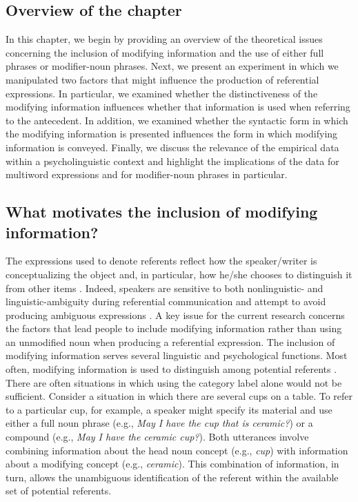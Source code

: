 \documentclass[output=paper]{langsci/langscibook}
\begin{document}
\subsection{Overview of the chapter}

In this chapter, we begin by providing an overview of the theoretical
issues concerning the inclusion of modifying information and the use
of either full phrases or modifier-noun phrases. Next, we present an
experiment in which we manipulated two factors that might influence
the production of referential expressions. In particular, we examined
whether the distinctiveness of the modifying information influences
whether that information is used when referring to the antecedent. In
addition, we examined whether the syntactic form in which the
modifying information is presented influences the form in which
modifying information is conveyed. Finally, we discuss the relevance
of the empirical data within a psycholinguistic context and highlight
the implications of the data for multiword expressions and for
modifier-noun phrases in particular.

\subsection{What motivates the inclusion of modifying information?}\largerpage

The expressions used to denote referents reflect how the
speaker/writer is conceptualizing the object and, in particular, how
he/she chooses to distinguish it from other items \citep{brown1958shall,olson1970language}. Indeed, speakers are sensitive to both nonlinguistic- and
linguistic-ambiguity during referential communication and attempt to
avoid producing ambiguous expressions \citep{ferreira2005speakers}. A key issue for the current research concerns the factors that
lead people to include modifying information rather than using an
unmodified noun when producing a referential expression. The inclusion
of modifying information serves several linguistic and psychological
functions. Most often, modifying information is used to distinguish
among potential referents \citep{downing1977creation,brekle1986production}. There are often
situations in which using the category label alone would not be
sufficient. Consider a situation in which there are several cups on a
table. To refer to a particular cup, for example, a speaker might
specify its material and use either a full noun phrase (e.g., \textit{May I
have the cup that is ceramic?}) or a compound (e.g., \textit{May I have the
ceramic cup?}). Both utterances involve combining information about the
head noun concept (e.g., \textit{cup}) with information about a modifying
concept (e.g., \textit{ceramic}). This combination of information, in turn,
allows the unambiguous identification of the referent within the
available set of potential referents.
\end{document}
